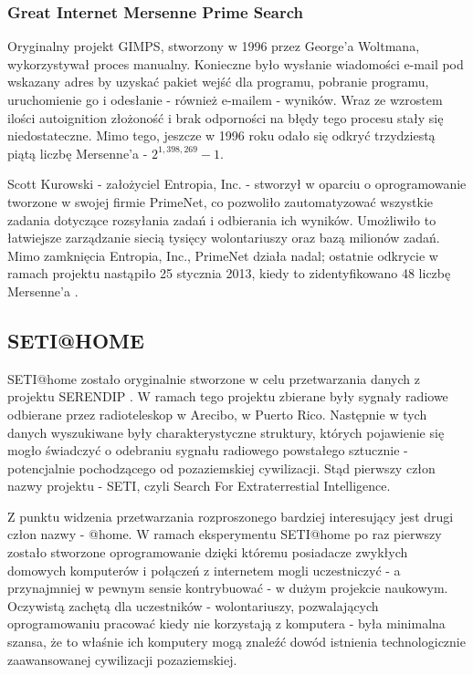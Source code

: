 \documentclass[12pt,a4paper,twoside]{article}
\begin{document}
\subsubsection{Great Internet Mersenne Prime Search}

Oryginalny projekt GIMPS, stworzony w 1996 przez George'a Woltmana, wykorzystywał proces manualny. Konieczne było wysłanie wiadomości e-mail pod wskazany adres by uzyskać pakiet wejść dla programu, pobranie programu, uruchomienie go i odesłanie - również e-mailem - wyników. Wraz ze wzrostem ilości autoignition złożoność i brak odporności na błędy tego procesu stały się niedostateczne. Mimo tego, jeszcze w 1996 roku odało się odkryć trzydziestą piątą liczbę Mersenne'a - $2^{1,398,269}-1$.

Scott Kurowski - założyciel Entropia, Inc. - stworzył w oparciu o oprogramowanie tworzone w swojej firmie PrimeNet, co pozwoliło zautomatyzować wszystkie zadania dotyczące rozsyłania zadań i odbierania ich wyników. Umożliwiło to łatwiejsze zarządzanie siecią tysięcy wolontariuszy oraz bazą milionów zadań. Mimo zamknięcia Entropia, Inc., PrimeNet działa nadal; ostatnie odkrycie w ramach projektu nastąpiło 25 stycznia 2013, kiedy to zidentyfikowano 48 liczbę Mersenne'a \cite{gimps_48}.

\subsection{SETI@HOME}

SETI@home zostało oryginalnie stworzone w celu przetwarzania danych z projektu SERENDIP \cite{seti_serendip}. W ramach tego projektu zbierane były sygnały radiowe odbierane przez radioteleskop w Arecibo, w Puerto Rico. Następnie w tych danych wyszukiwane były charakterystyczne struktury, których pojawienie się mogło świadczyć o odebraniu sygnału radiowego powstałego sztucznie - potencjalnie pochodzącego od pozaziemskiej cywilizacji. Stąd pierwszy człon nazwy projektu - SETI, czyli Search For Extraterrestial Intelligence.

Z punktu widzenia przetwarzania rozproszonego bardziej interesujący jest drugi człon nazwy - @home. W ramach eksperymentu SETI@home po raz pierwszy zostało stworzone oprogramowanie dzięki któremu posiadacze zwykłych domowych komputerów i połączeń z internetem mogli uczestniczyć - a przynajmniej w pewnym sensie kontrybuować - w dużym projekcie naukowym. Oczywistą zachętą dla uczestników - wolontariuszy, pozwalających oprogramowaniu pracować kiedy nie korzystają z komputera - była minimalna szansa, że to właśnie ich komputery mogą znaleźć dowód istnienia technologicznie zaawansowanej cywilizacji pozaziemskiej.
\end{document}
